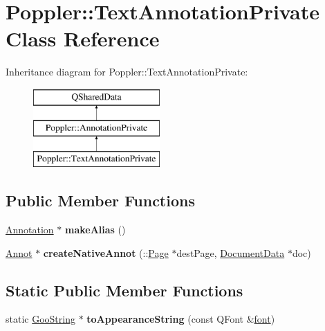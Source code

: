 \hypertarget{class_poppler_1_1_text_annotation_private}{}\section{Poppler\+:\+:Text\+Annotation\+Private Class Reference}
\label{class_poppler_1_1_text_annotation_private}
Inheritance diagram for Poppler\+:\+:Text\+Annotation\+Private\+:\begin{figure}[H]
\begin{center}
\leavevmode
\includegraphics[height=3.000000cm]{class_poppler_1_1_text_annotation_private}
\end{center}
\end{figure}
\subsection*{Public Member Functions}
\begin{DoxyCompactItemize}
\item 
\mbox{\label{class_poppler_1_1_text_annotation_private_afcdb8bdc345807ea2a14c3c2aac81671}} 
\hyperlink{class_poppler_1_1_annotation}{Annotation} $\ast$ {\bfseries make\+Alias} ()
\item 
\mbox{\label{class_poppler_1_1_text_annotation_private_a16be9d767ce212c7fe7f761078388405}} 
\hyperlink{class_annot}{Annot} $\ast$ {\bfseries create\+Native\+Annot} (\+::\hyperlink{class_poppler_1_1_page}{Page} $\ast$dest\+Page, \hyperlink{class_poppler_1_1_document_data}{Document\+Data} $\ast$doc)
\end{DoxyCompactItemize}
\subsection*{Static Public Member Functions}
\begin{DoxyCompactItemize}
\item 
\mbox{\label{class_poppler_1_1_text_annotation_private_aa16d23c6f171a54fc92fc67b80195c43}} 
static \hyperlink{class_goo_string}{Goo\+String} $\ast$ {\bfseries to\+Appearance\+String} (const Q\+Font \&\hyperlink{structfont}{font})
\end{DoxyCompactItemize}
